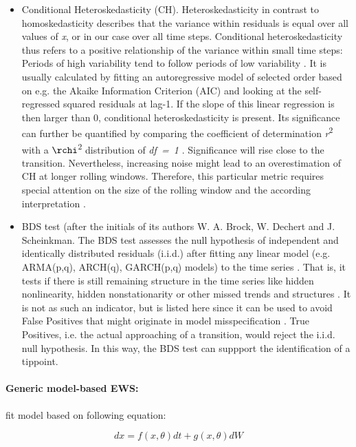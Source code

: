 \begin{itemize}
	\item Conditional Heteroskedasticity (CH). Heteroskedasticity in contrast to homoskedasticity describes that the variance within residuals is equal over all values of \textit{x}, or in our case over all time steps. Conditional heteroskedasticity thus refers to a positive relationship of the variance within small time steps: Periods of high variability tend to follow periods of low variability \citep{seekell2011}. It is usually calculated by fitting an autoregressive model of selected order based on e.g. the Akaike Information Criterion (AIC) and looking at the self-regressed squared residuals at lag-1. If the slope of this linear regression is then larger than 0, conditional heteroskedasticity is present. Its significance can further be quantified by comparing the coefficient of determination \textit{r}\textsuperscript{2} with a $\rchi$\textsuperscript{2} distribution of \textit{df~=~1} \citep{dakos2012}. Significance will rise close to the transition. Nevertheless, increasing noise might lead to an overestimation of CH at longer rolling windows. Therefore, this particular metric requires special attention on the size of the rolling window and the according interpretation \citep{seekell2011}.
	\item BDS test (after the initials of its authors W. A. Brock, W. Dechert and J. Scheinkman. The BDS test assesses the null hypothesis of independent and identically distributed residuals (i.i.d.) after fitting any linear model (e.g. ARMA(p,q), ARCH(q), GARCH(p,q) models) to the time series \citep{broock1996}. That is, it tests if there is still remaining structure in the time series like hidden nonlinearity, hidden nonstationarity or other missed trends and structures \citep{carpenter2011a}. It is not as such an indicator, but is listed here since it can be used to avoid False Positives that might originate in model misspecification \citep{dakos2012}. True Positives, i.e. the actual approaching of a transition, would reject the i.i.d. null hypothesis. In this way, the BDS test can suppport the identification of a \gls{tippoint}.
\end{itemize}

\paragraph{Generic model-based EWS:}
fit model based on following equation:  %

\begin{equation}\label{eq:modelews}
	dx = f(x, \theta )dt + g(x, \theta )dW
\end{equation}

